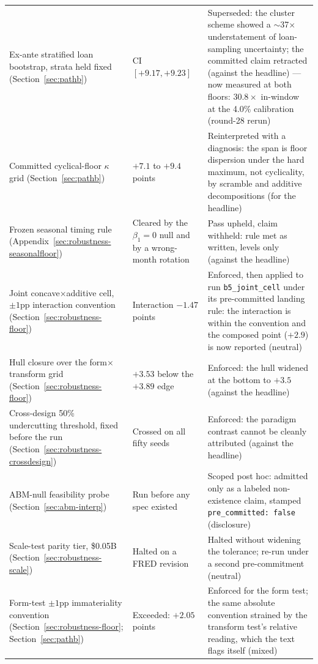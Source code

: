 \documentclass[12pt]{article}
\begin{document}
{\begin{longtable}{@{}p{4.4cm}p{4.2cm}p{5.6cm}@{}}
Ex-ante stratified loan bootstrap, strata held fixed (Section~\ref{sec:pathb}) & CI $[+9.17, +9.23]$ & Superseded: the cluster scheme showed a $\sim$37$\times$ understatement of loan-sampling uncertainty; the committed claim retracted (against the headline)  --- now measured at both floors: $30.8\times$ in-window at the 4.0\% calibration (round-28 rerun)\\
Committed cyclical-floor $\kappa$ grid (Section~\ref{sec:pathb}) & $+7.1$ to $+9.4$ points & Reinterpreted with a diagnosis: the span is floor dispersion under the hard maximum, not cyclicality, by scramble and additive decompositions (for the headline) \\
Frozen seasonal timing rule (Appendix~\ref{sec:robustness-seasonalfloor}) & Cleared by the $\beta_1 = 0$ null and by a wrong-month rotation & Pass upheld, claim withheld: rule met as written, levels only (against the headline) \\
Joint concave$\times$additive cell, $\pm 1$pp interaction convention (Section~\ref{sec:robustness-floor}) & Interaction $-1.47$ points & Enforced, then applied to run \texttt{b5\_joint\_cell} under its pre-committed landing rule: the interaction is within the convention and the composed point ($+2.9$) is now reported (neutral)\\
Hull closure over the form$\times$transform grid (Section~\ref{sec:robustness-floor}) & $+3.53$ below the $+3.89$ edge & Enforced: the hull widened at the bottom to $+3.5$ (against the headline) \\
Cross-design 50\% undercutting threshold, fixed before the run (Section~\ref{sec:robustness-crossdesign}) & Crossed on all fifty seeds & Enforced: the paradigm contrast cannot be cleanly attributed (against the headline) \\
ABM-null feasibility probe (Section~\ref{sec:abm-interp}) & Run before any spec existed & Scoped post hoc: admitted only as a labeled non-existence claim, stamped \texttt{pre\_committed: false} (disclosure) \\
Scale-test parity tier, \$0.05B (Section~\ref{sec:robustness-scale}) & Halted on a FRED revision & Halted without widening the tolerance; re-run under a second pre-commitment (neutral) \\
Form-test $\pm 1$pp immateriality convention (Section~\ref{sec:robustness-floor}; Section~\ref{sec:pathb}) & Exceeded: $+2.05$ points & Enforced for the form test; the same absolute convention strained by the transform test's relative reading, which the text flags itself (mixed) \\

\end{longtable}}
\end{document}
